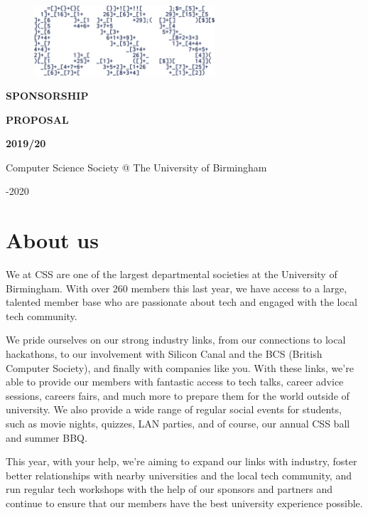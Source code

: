 \documentclass{article}
\begin{document}

\begin{figure}
  \includegraphics[width=0.6\textwidth]{CSS_Logo}
\end{figure}

\vspace*{0.01cm}

\fontsize{56}{50}\selectfont

\noindent\textbf{SPONSORSHIP}
\par
\noindent\textbf{PROPOSAL}
\par
\noindent\textbf{2019/20}

\fontsize{13}{18}\selectfont
\vspace{0.5cm}
\noindent Computer Science Society @ The University of Birmingham \par
{}-2020

\newpage

\section*{About us}

We at CSS are one of the largest departmental societies at the University of Birmingham. With over 260 members this last year, we have access to a large, talented member base who are passionate about tech and engaged with the local tech community.

\vspace{1cm}

We pride ourselves on our strong industry links, from our connections to local hackathons, to our involvement with Silicon Canal and the BCS (British Computer Society), and finally with companies like you.
With these links, we're able to provide our members with fantastic access to tech talks, career advice sessions, careers fairs, and much more to prepare them for the world outside of university.
We also provide a wide range of regular social events for students, such as movie nights, quizzes, LAN parties, and of course, our annual CSS ball and summer BBQ.

\vspace{1cm}

This year, with your help, we're aiming to expand our links with industry, foster better relationships with nearby universities and the local tech community, and run regular tech workshops with the help of our sponsors and partners and continue to ensure that our members have the best university experience possible.
\end{document}
